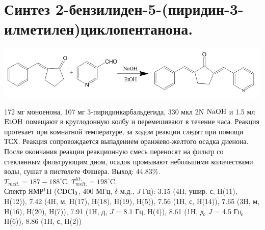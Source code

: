 \documentclass[a4paper]{article}
\begin{document}
\section{Синтез 2-бензилиден-5-(пиридин-3-илметилен)циклопентанона.}
\begin{center}
\includegraphics[scale=0.35]{pictures/3.png}
\end{center}
172 мг моноенона, 107 мг 3-пиридинкарбальдегида, 330 мкл 2N $\ce{NaOH}$ и 1.5 мл $\ce{EtOH}$ помещают в круглодонную колбу и перемешивают в течение часа. Реакция протекает при комнатной температуре, за ходом реакции следят при помощи ТСХ. Реакция сопровождается выпадением оранжево-желтого осадка диенона. После окончания реакции реакционную смесь переносят на фильтр со стеклянным фильтрующим дном, осадок промывают небольшими количествами воды, сушат в пистолете Фишера.
Выход: 44.83$\%$. \\
$T_{melt.} = 187-188^{\circ}$С. $T_{melt.}^{lit.} = 198^{\circ}$C. \cite{vatsadze2005} \\
Спектр ЯМР$^{1}$H ($\ce{CDCl3}$, 400 МГц, $\delta$ м.д., \textit{J} Гц): 3.15 (4H, ушир. с, H(11), H(12)), 7.42 (4H, м, H(17), H(18), H(19), H(5)), 7.56 (1H, с, H(14)), 7.65 (3H, м, H(16), H(20), H(7)), 7.91 (1H, д, \textit{J} = 8.1 Гц, H(4)), 8.61 (1H, д, \textit{J} = 4.5 Гц, H(6)), 8.86 (1H, с, H(2))
\end{document}
